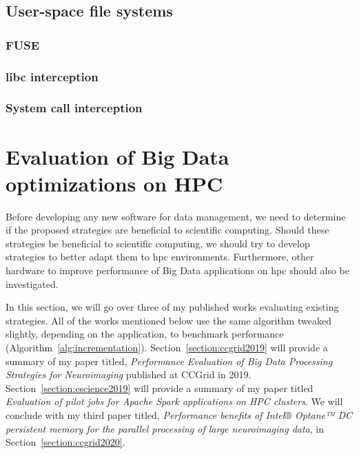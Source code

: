 \documentclass{report}
\begin{document}
        \section{User-space file systems}
            \subsection{FUSE}
            \subsection{libc interception}
            \subsection{System call interception}

    \chapter{Evaluation of Big Data optimizations on HPC}\label{chp:eval}

        Before developing any new software for data management, we need to
        determine if the proposed strategies are beneficial to scientific computing.
        Should these strategies be beneficial to scientific computing, we should try
        to develop strategies to better adapt them to \gls{hpc} environments. Furthermore,
        other hardware to improve performance of Big Data applications on \gls{hpc}
        should also be investigated.

        In this section, we will go over three of my published works evaluating existing
        strategies. All of the works mentioned below use the same algorithm tweaked
        slightly, depending on the application, to benchmark
        performance (Algorithm~\ref{alg:incrementation}). Section~\ref{section:ccgrid2019} will provide a summary of my
        paper titled, \textit{Performance Evaluation of Big Data Processing Strategies for Neuroimaging}
        published at CCGrid in 2019. Section~\ref{section:escience2019} will provide
        a summary of my paper titled \textit{Evaluation of pilot jobs for Apache Spark applications on HPC clusters}. We will conclude with my third paper titled,
        \textit{Performance benefits of Intel® Optane™ DC persistent memory for the parallel processing of large neuroimaging data}, in Section~\ref{section:ccgrid2020}.
\end{document}
